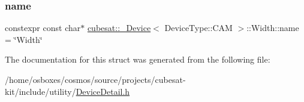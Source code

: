\subsubsection{\texorpdfstring{name}{name}}
{\footnotesize\ttfamily constexpr const char$\ast$ \hyperlink{structcubesat_1_1__Device}{cubesat\+::\+\_\+\+Device}$<$ Device\+Type\+::\+C\+AM $>$\+::Width\+::name = \char`\"{}Width\char`\"{}\hspace{0.3cm}{\ttfamily [static]}}



The documentation for this struct was generated from the following file\+:\begin{DoxyCompactItemize}
\item 
/home/osboxes/cosmos/source/projects/cubesat-\/kit/include/utility/\hyperlink{DeviceDetail_8h}{Device\+Detail.\+h}\end{DoxyCompactItemize}
